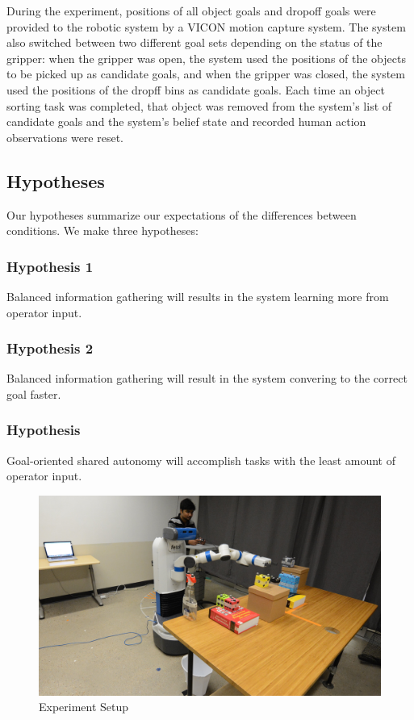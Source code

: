 \documentclass[conference]{IEEEtran}
\begin{document}

During the experiment, positions of all object goals and dropoff goals were provided to the robotic system by a VICON motion capture system. The system also switched between two different goal sets depending on the status of the gripper: when the gripper was open, the system used the positions of the objects to be picked up as candidate goals, and when the gripper was closed, the system used the positions of the dropff bins as candidate goals. Each time an object sorting task was completed, that object was removed from the system's list of candidate goals and the system's belief state and recorded human action observations were reset.

\subsection{Hypotheses}

Our hypotheses summarize our expectations of the differences between conditions. We make three hypotheses:
\subsubsection{Hypothesis 1} Balanced information gathering will results in the system learning more from operator input.
\subsubsection{Hypothesis 2} Balanced information gathering will result in the system convering to the correct goal faster.
\subsubsection{Hypothesis} Goal-oriented shared autonomy will accomplish tasks with the least amount of operator input.

\begin{figure}
\includegraphics[width=\columnwidth]{figures/task_setup-v2.JPG}
\caption{Experiment Setup}
\label{exp_setup}
\end{figure}
\end{document}
